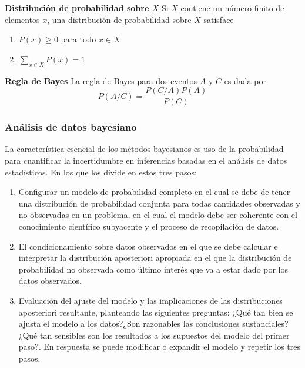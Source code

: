 \begin{defi}
    \textbf{Distribución de probabilidad sobre $X$} \parencite{koski2011bayesian}
    Si $X$ contiene un número finito de elementos $x$, una distribución de probabilidad sobre $X$ satisface
    \begin{enumerate}
        \item $P(x) \geq 0$ para todo $x \in X$
        \item $\sum\limits_{x \in X}^{}P(x) = 1$
    \end{enumerate}
\end{defi}

\begin{defi}
    \textbf{Regla de Bayes} \parencite{koski2011bayesian}
    La regla de Bayes para dos eventos $A$ y $C$ es dada por
    $$P(A/C) = \frac{P(C/A)P(A)}{P(C)}$$
\end{defi}

\subsubsection{Análisis de datos bayesiano}
La característica esencial de los métodos bayesianos es uso de la probabilidad para cuantificar la incertidumbre en inferencias basadas en el análisis de datos estadísticos. En los que \textcite{gelman1995bayesian} los divide en estos tres pasos:
\begin{enumerate}
    \item Configurar un modelo de probabilidad completo en el cual se debe de tener una distribución de probabilidad conjunta para todas cantidades observadas y no observadas en un problema, en el cual el modelo debe ser coherente con el conocimiento científico subyacente y el proceso de recopilación de datos.
    \item El condicionamiento sobre datos observados en el que se debe calcular e interpretar la distribución aposteriori apropiada en el que la distribución de probabilidad no observada como último interés que va a estar dado por los datos observados.
    \item Evaluación del ajuste del modelo y las implicaciones de las distribuciones aposteriori resultante, planteando las siguientes preguntas: ¿Qué tan bien se ajusta el modelo a los datos?¿Son razonables las conclusiones sustanciales?¿Qué tan sensibles son los resultados a los supuestos del modelo del primer paso?. En respuesta se puede modificar o expandir el modelo y repetir los tres pasos.
\end{enumerate}

